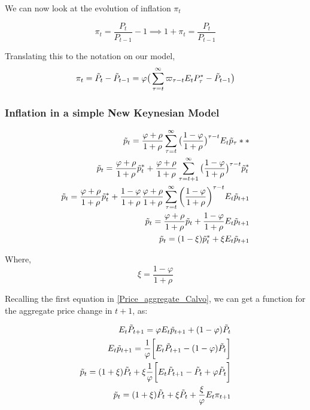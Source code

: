 We can now look at the evolution of inflation $\pi_{t}$

\begin{equation*}
    \pi_{t}=\frac{P_{t}}{P_{t-1}}-1 \implies 1+\pi_{t}=\frac{P_{t}}{P_{t-1}}
\end{equation*}

Translating this to the notation on our model, 
\begin{equation*}
    \pi_{t}=\Tilde{P}_{t}-\Tilde{P}_{t-1}=\varphi\big(\sum^{\infty}_{\tau=t}\varpi_{\tau-t}E_{t}P_{\tau}^{*}-\Tilde{P}_{t-1}\big)
\end{equation*}

\subsubsection{Inflation in a simple New Keynesian Model}
\begin{equation}
\begin{aligned}
    \Tilde{p}_{t}=\frac{\varphi+\rho}{1+\rho}\sum^{\infty}_{\tau=t}\big(\frac{1-\varphi}{1+\rho}\big)^{\tau-t}E_{t}\Tilde{p}_{\tau}*{*} \\
    \Tilde{p}_{t}=\frac{\varphi+\rho}{1+\rho}\Tilde{p}_{t}^{*}+\frac{\varphi+\rho}{1+\rho}\sum^{\infty}_{\tau=t+1}\big(\frac{1-\varphi}{1+\rho}\big)^{\tau-t}\Tilde{p}_{t}^{*} \\ 
     \Tilde{p}_{t}=\frac{\varphi+\rho}{1+\rho}\Tilde{p}_{t}^{*}+\frac{1-\varphi}{1+\rho}\frac{\varphi+\rho}{1+\rho}\sum^{\infty}_{\tau=t}\bigg (\frac{1-\varphi}{1+\rho} \bigg)^{\tau-t}E_{t}\Tilde{p}_{t+1} \\
     \Tilde{p}_{t}=\frac{\varphi+\rho}{1+\rho}\Tilde{p}_{t}+\frac{1-\varphi}{1+\rho}E_{t}\Tilde{p}_{t+1} \\
    \Tilde{p}_{t}=(1-\xi)\Tilde{p}_{t}^{*}+\xi E_{t}\Tilde{p}_{t+1}
\end{aligned}
\end{equation}

Where, 
\begin{equation*}
    \xi=\frac{1-\varphi}{1+\rho}
\end{equation*}

Recalling the first equation in \ref{Price_aggregate_Calvo}, we can get a function for the aggregate price change in $t+1$, as: 

\begin{equation*}
\begin{aligned}
E_{t}\Tilde{P}_{t+1}=\varphi E_{t}\Tilde{p}_{t+1}+(1-\varphi)\Tilde{P}_{t} \\
E_{t}\Tilde{p}_{t+1}=\frac{1}{\varphi}\bigg[E_{t}\Tilde{P}_{t+1}-(1-\varphi)\Tilde{P}_{t}\bigg] \\ 
\Tilde{p}_{t}=(1+\xi)\Tilde{P}_{t}+\xi\frac{1}{\varphi}\bigg[E_{t}\Tilde{P}_{t+1}-\Tilde{P}_{t}+\varphi\Tilde{P}_{t}\bigg] \\ 
\Tilde{p}_{t}=(1+\xi)\Tilde{P}_{t} +\xi\Tilde{P}_{t}+\frac{\xi}{\varphi}E_{t}\pi_{t+1}
\end{aligned}
\end{equation*}


